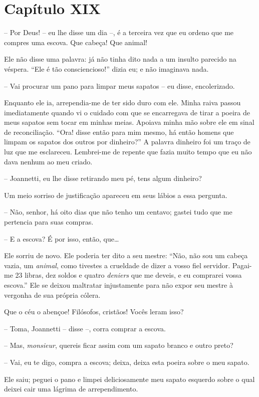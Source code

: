 \section{Capítulo XIX}

 -- Por Deus! -- eu lhe disse um dia --, é a terceira vez que eu
ordeno que me compres uma escova. Que cabeça! Que animal!

 Ele não disse uma palavra: já não tinha dito nada a um insulto parecido
na véspera. ``Ele é tão consciencioso!'' dizia eu; e não imaginava nada.

 -- Vai procurar um pano para limpar meus sapatos -- eu disse,
encolerizado.

Enquanto ele ia, arrependia-me de ter sido duro com ele. Minha raiva
passou imediatamente quando vi o cuidado com que se encarregava de
tirar a poeira de meus sapatos sem tocar em minhas meias. Apoiava minha
mão sobre ele em sinal de reconciliação. ``Ora! disse então para mim
mesmo, há então homens que limpam os sapatos dos outros por dinheiro?''
A palavra dinheiro foi um traço de luz que me esclareceu. Lembrei-me de
repente que fazia muito tempo que eu não dava nenhum ao meu criado.

-- Joannetti, eu lhe disse retirando meu pé, tens algum dinheiro?

Um meio sorriso de justificação apareceu em seus lábios a essa pergunta.


-- Não, senhor, há oito dias que não tenho um centavo; gastei tudo que
me pertencia para suas compras.

-- E a escova? É por isso, então, que\ldots

Ele sorriu de novo. Ele poderia ter dito a seu mestre: ``Não, não sou um
cabeça vazia, um \textit{animal}, como tivestes a crueldade de dizer a
vosso fiel servidor. Pagai-me 23 libras, dez soldos e quatro \textit{deniers}
que me deveis, e eu comprarei vossa escova.'' Ele se deixou maltratar
injustamente para não expor seu mestre à vergonha de sua própria
cólera.

Que o céu o abençoe! Filósofos, cristãos! Vocês leram isso?

-- Toma, Joannetti -- disse --, corra comprar a escova.

-- Mas, \textit{monsieur}, quereis ficar assim com um sapato branco e
outro preto?

-- Vai, eu te digo, compra a escova; deixa, deixa esta poeira sobre o
meu sapato.

Ele saiu; peguei o pano e limpei deliciosamente meu sapato esquerdo
sobre o qual deixei cair uma lágrima de arrependimento.

